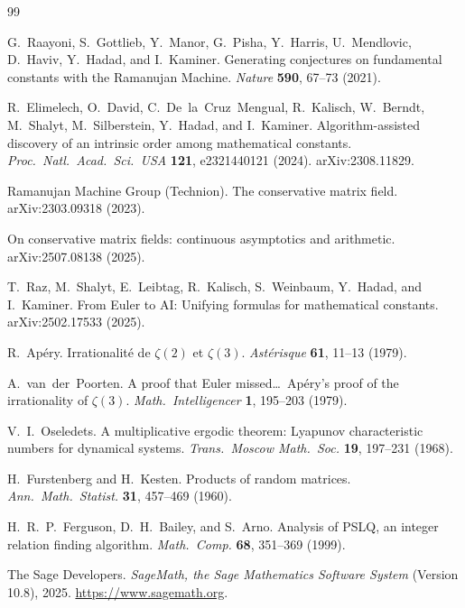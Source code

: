 \documentclass[11pt,a4paper]{article}
\theoremstyle{definition}
\begin{document}
\begin{thebibliography}{99}

G.~Raayoni, S.~Gottlieb, Y.~Manor, G.~Pisha, Y.~Harris, U.~Mendlovic, D.~Haviv, Y.~Hadad, and
I.~Kaminer.
\newblock Generating conjectures on fundamental constants with the Ramanujan Machine.
\newblock \emph{Nature} \textbf{590}, 67--73 (2021).

R.~Elimelech, O.~David, C.~De~la~Cruz~Mengual, R.~Kalisch, W.~Berndt, M.~Shalyt,
M.~Silberstein, Y.~Hadad, and I.~Kaminer.
\newblock Algorithm-assisted discovery of an intrinsic order among mathematical constants.
\newblock \emph{Proc.\ Natl.\ Acad.\ Sci.\ USA} \textbf{121}, e2321440121 (2024).
\newblock arXiv:2308.11829.

Ramanujan Machine Group (Technion).
\newblock The conservative matrix field.
\newblock arXiv:2303.09318 (2023).

On conservative matrix fields: continuous asymptotics and arithmetic.
\newblock arXiv:2507.08138 (2025).

T.~Raz, M.~Shalyt, E.~Leibtag, R.~Kalisch, S.~Weinbaum, Y.~Hadad, and I.~Kaminer.
\newblock From Euler to AI: Unifying formulas for mathematical constants.
\newblock arXiv:2502.17533 (2025).

R.~Ap\'ery.
\newblock Irrationalit\'e de $\zeta(2)$ et $\zeta(3)$.
\newblock \emph{Ast\'erisque} \textbf{61}, 11--13 (1979).

A.~van~der~Poorten.
\newblock A proof that Euler missed\ldots\ Ap\'ery's proof of the irrationality of $\zeta(3)$.
\newblock \emph{Math.\ Intelligencer} \textbf{1}, 195--203 (1979).

V.~I.~Oseledets.
\newblock A multiplicative ergodic theorem: Lyapunov characteristic numbers for dynamical
systems.
\newblock \emph{Trans.\ Moscow Math.\ Soc.} \textbf{19}, 197--231 (1968).

H.~Furstenberg and H.~Kesten.
\newblock Products of random matrices.
\newblock \emph{Ann.\ Math.\ Statist.} \textbf{31}, 457--469 (1960).

H.~R.~P.~Ferguson, D.~H.~Bailey, and S.~Arno.
\newblock Analysis of PSLQ, an integer relation finding algorithm.
\newblock \emph{Math.\ Comp.} \textbf{68}, 351--369 (1999).

The Sage Developers.
\newblock \emph{SageMath, the Sage Mathematics Software System} (Version 10.8), 2025.
\newblock \url{https://www.sagemath.org}.

\end{thebibliography}
\end{document}
